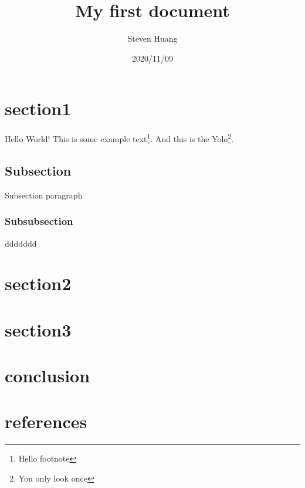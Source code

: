 \documentclass{article}
\title{ My first document}
\date{2020/11/09}
\author{Steven Huang}
\begin{document}
\maketitle
\newpage
{}

\section{section1}
Hello World! This is some example text\footnote{\label{myfootnote}Hello footnote}.
And this is the Yolo\footnote{\label{aaa}You only look once}.
\subsection{Subsection}
Subsection paragraph

\subsubsection{Subsubsection}
ddddddd

\section{section2}
\section{section3}
\section{conclusion}
\section{references}
\end{document}

